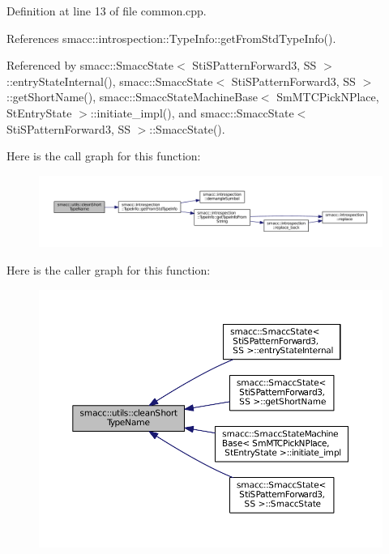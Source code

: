 Definition at line 13 of file common.\+cpp.



References smacc\+::introspection\+::\+Type\+Info\+::get\+From\+Std\+Type\+Info().



Referenced by smacc\+::\+Smacc\+State$<$ Sti\+S\+Pattern\+Forward3, S\+S $>$\+::entry\+State\+Internal(), smacc\+::\+Smacc\+State$<$ Sti\+S\+Pattern\+Forward3, S\+S $>$\+::get\+Short\+Name(), smacc\+::\+Smacc\+State\+Machine\+Base$<$ Sm\+M\+T\+C\+Pick\+N\+Place, St\+Entry\+State $>$\+::initiate\+\_\+impl(), and smacc\+::\+Smacc\+State$<$ Sti\+S\+Pattern\+Forward3, S\+S $>$\+::\+Smacc\+State().




Here is the call graph for this function\+:
\nopagebreak
\begin{figure}[H]
\begin{center}
\leavevmode
\includegraphics[width=350pt]{namespacesmacc_1_1utils_aacd1975bb7cd9bec4b50e111a2ae7edb_cgraph}
\end{center}
\end{figure}




Here is the caller graph for this function\+:
\nopagebreak
\begin{figure}[H]
\begin{center}
\leavevmode
\includegraphics[width=350pt]{namespacesmacc_1_1utils_aacd1975bb7cd9bec4b50e111a2ae7edb_icgraph}
\end{center}
\end{figure}


